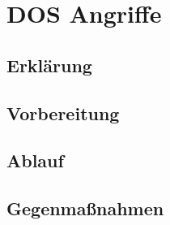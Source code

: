 \chapter{DOS Angriffe}
\section{Erklärung}
\section{Vorbereitung}
\section{Ablauf}
\section{Gegenmaßnahmen}